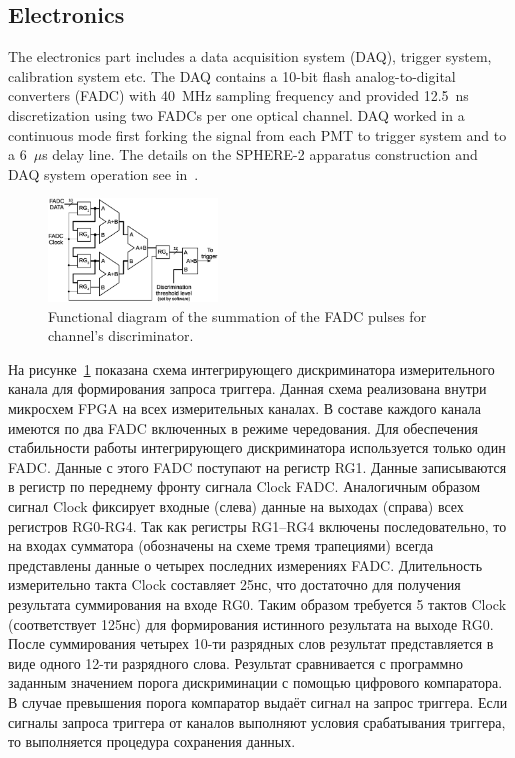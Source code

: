 \documentclass[final,5p,times,twocolumn]{elsarticle}
\begin{document}
\subsection{Electronics}
The electronics part includes a data acquisition system (DAQ), trigger system, calibration system etc. The DAQ contains a 10-bit flash analog-to-digital converters (FADC) with 40~MHz sampling frequency and provided 12.5~ns discretization using two \mbox{FADCs} per one optical channel. DAQ worked in a continuous mode first forking the signal from each PMT to trigger system and to a 6~$\mu$s delay line. The details on the \mbox{SPHERE-2} apparatus construction and DAQ system operation see in~\cite{Ant15a}. 

\begin{figure}[tb]
\centering
\includegraphics[width=0.4\textwidth]{figs/int_discr.eps}
\caption{Functional diagram of the summation of the FADC pulses for channel's discriminator.}
\label{fig:int_discr}
\end{figure}

{\Russian
На рисунке~\ref{fig:int_discr} показана схема интегрирующего дискриминатора измерительного канала для формирования запроса триггера. Данная схема реализована внутри микросхем FPGA на всех измерительных каналах. В составе каждого канала имеются по два FADC включенных в режиме чередования. Для обеспечения стабильности работы интегрирующего дискриминатора используется только один FADC. Данные с этого FADC поступают на регистр RG1. Данные записываются в регистр по переднему фронту сигнала Clock FADC. Аналогичным образом сигнал Clock фиксирует входные (слева) данные на выходах (справа) всех регистров RG0-RG4. Так как регистры RG1--RG4 включены последовательно, то на входах сумматора (обозначены на схеме тремя трапециями) всегда представлены данные о четырех последних измерениях FADC. Длительность измерительно такта Clock составляет 25нс, что достаточно для получения результата суммирования на входе RG0. Таким образом требуется 5 тактов Clock (соответствует 125нс) для формирования истинного результата на выходе RG0. После суммирования четырех 10-ти разрядных слов результат представляется в виде одного 12-ти разрядного слова. Результат сравнивается с программно заданным значением порога дискриминации с помощью цифрового компаратора. В случае превышения порога компаратор выдаёт сигнал на запрос триггера. Если сигналы запроса триггера от каналов выполняют условия срабатывания триггера, то выполняется процедура сохранения данных.    
}
\end{document}
